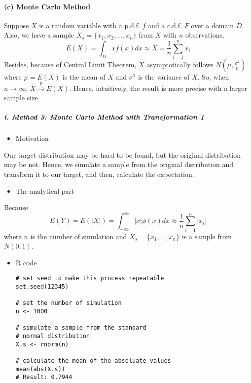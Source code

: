 \documentclass[12pt]{article}
\begin{document}
\hypertarget{c-monte-carlo-method}{%
\paragraph{(c) Monte Carlo Method}\label{c-monte-carlo-method}}

Suppose \(X\) is a random variable with a p.d.f. \(f\) and a c.d.f.
\(F\) over a domain \(D\). Also, we have a sample
\(X_s = \{x_1, x_2, ..., x_n\}\) from \(X\) with \(n\) observations.
\begin{equation*}
            E(X) = \int_{D}xf(x)dx \approx \bar{X} = \frac{1}{n} \sum_{i = 1}^{n}x_i
            \end{equation*} Besides, because of Central Limit Theorem,
\(\bar{X}\) asymptotically follows \(N(\mu, \frac{\sigma^2}{n})\) where
\(\mu = E(X)\) is the mean of \(X\) and \(\sigma^2\) is the variance of
\(X\). So, when \(n \rightarrow \infty\),
\(\bar{X} \xrightarrow{p} E(X)\). Hence, intuitively, the result is more
precise with a larger sample size.

\hypertarget{i.-method-3-monte-carlo-method-with-transformation-1}{%
\subparagraph{i. Method 3: Monte Carlo Method with Transformation
1}\label{i.-method-3-monte-carlo-method-with-transformation-1}}

\begin{itemize}
\tightlist
\item
  Motivation
\end{itemize}

Our target distribution may be hard to be found, but the original
distribution may be not. Hence, we simulate a sample from the original
distribution and transform it to our target, and then, calculate the
expectation.

\begin{itemize}
\tightlist
\item
  The analytical part
\end{itemize}

Because \begin{equation*}
                    E(Y) = E(|X|) = \int_{-\infty}^{\infty}|x| \phi(x)dx \approx \frac{1}{n}\sum_{i = 1}^{n} |x_i|
                    \end{equation*} where \(n\) is the number of
simulation and \(X_s = \{ x_1, ..., x_n\}\) is a sample from
\(N(0, 1)\).

\begin{itemize}
\item
  R code

\begin{verbatim}
# set seed to make this process repeatable
set.seed(12345)

# set the number of simulation
n <- 1000

# simulate a sample from the standard 
# normal distribution
X.s <- rnorm(n)

# calculate the mean of the absoluate values
mean(abs(X.s))
# Result: 0.7944
\end{verbatim}
\end{itemize}
\end{document}
